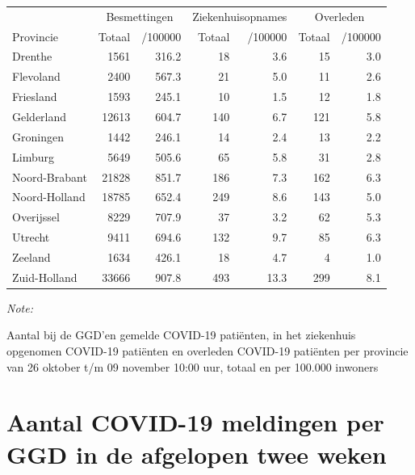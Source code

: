 \documentclass[
  english,
  man,floatsintext]{apa6}
\begin{document}
\begin{table}[H]
\centering
\begin{threeparttable}
\begin{tabular}{lrrrrrr}
\toprule
\multicolumn{1}{c}{ } & \multicolumn{2}{c}{Besmettingen} & \multicolumn{2}{c}{Ziekenhuisopnames} & \multicolumn{2}{c}{Overleden} \\
\cmidrule(l{3pt}r{3pt}){2-3} \cmidrule(l{3pt}r{3pt}){4-5} \cmidrule(l{3pt}r{3pt}){6-7}
Provincie & Totaal & /100000 & Totaal & /100000 & Totaal & /100000\\
\midrule
Drenthe & 1561 & 316.2 & 18 & 3.6 & 15 & 3.0\\
Flevoland & 2400 & 567.3 & 21 & 5.0 & 11 & 2.6\\
Friesland & 1593 & 245.1 & 10 & 1.5 & 12 & 1.8\\
Gelderland & 12613 & 604.7 & 140 & 6.7 & 121 & 5.8\\
Groningen & 1442 & 246.1 & 14 & 2.4 & 13 & 2.2\\
Limburg & 5649 & 505.6 & 65 & 5.8 & 31 & 2.8\\
Noord-Brabant & 21828 & 851.7 & 186 & 7.3 & 162 & 6.3\\
Noord-Holland & 18785 & 652.4 & 249 & 8.6 & 143 & 5.0\\
Overijssel & 8229 & 707.9 & 37 & 3.2 & 62 & 5.3\\
Utrecht & 9411 & 694.6 & 132 & 9.7 & 85 & 6.3\\
Zeeland & 1634 & 426.1 & 18 & 4.7 & 4 & 1.0\\
Zuid-Holland & 33666 & 907.8 & 493 & 13.3 & 299 & 8.1\\
\bottomrule
\end{tabular}
\begin{tablenotes}
\item \textit{Note: } 
\item Aantal bij de GGD’en gemelde COVID-19 patiënten, in het ziekenhuis opgenomen COVID-19 patiënten en overleden COVID-19 patiënten per provincie van 26 oktober t/m 09 november 10:00 uur, totaal en per 100.000 inwoners
\end{tablenotes}
\end{threeparttable}
\end{table}

\newpage

\hypertarget{aantal-covid-19-meldingen-per-ggd-in-de-afgelopen-twee-weken}{%
\section{Aantal COVID-19 meldingen per GGD in de afgelopen twee weken}\label{aantal-covid-19-meldingen-per-ggd-in-de-afgelopen-twee-weken}}
\end{document}
